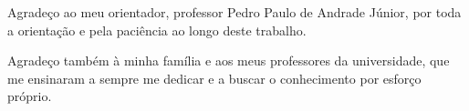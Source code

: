 \begin{resumo}[Agradecimentos]

\vspace{\onelineskip}

Agradeço ao meu orientador, professor Pedro Paulo de Andrade Júnior, por toda a orientação e pela paciência ao longo deste trabalho.

\vspace{\onelineskip}
Agradeço também à minha família e aos meus professores da universidade, que me ensinaram a sempre me dedicar e a buscar o conhecimento por esforço próprio.

\end{resumo}
